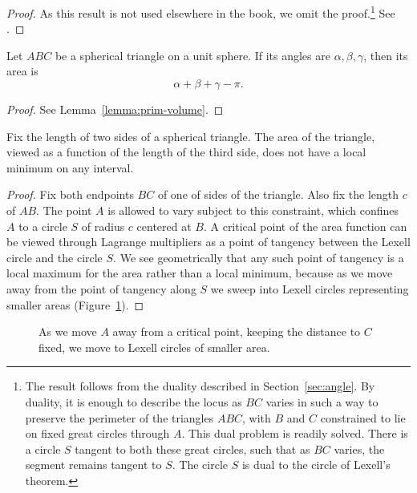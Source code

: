 \begin{proof} As this result is not used elsewhere in the book, we omit the proof.\footnote{The result follows from the duality described in Section~\ref{sec:angle}.  By duality, it is enough to describe the locus as $BC$ varies
in such a way to preserve the perimeter of the triangles $ABC$, with
$B$ and $C$ constrained to lie on fixed great circles through $A$.  This dual problem is
readily solved.
There is a circle $S$ tangent to both these great circles, such that
as $BC$ varies, 
the segment remains tangent to $S$.  The circle $S$ is dual
to the circle of Lexell's theorem.}
See \cite{Fej72}.
\end{proof}

\begin{lemma}[Girard] Let $ABC$ be a spherical triangle on a unit sphere. If its angles
are $\alpha,\beta,\gamma$, then its area is
   $$
   \alpha+\beta+\gamma-\pi.
   $$
\end{lemma}

\begin{proof} See Lemma~\ref{lemma:prim-volume}.
\end{proof}

\begin{lemma} Fix the length of two sides of a spherical triangle.
The area of the triangle, viewed as a function of the length of
the third side, does not have a local minimum on any interval.
\end{lemma}

\begin{proof}  Fix both endpoints $BC$ of one of sides of the triangle.
Also fix the length $c$ of $AB$.  The point $A$ is allowed to vary
subject to this constraint, which confines $A$ to a circle $S$
of radius $c$ centered at $B$.
A critical point of the area function can be viewed
through Lagrange multipliers 
as a point of tangency between the Lexell circle 
and the circle $S$.
We see geometrically that any such point of tangency is a local
maximum for the area rather than a local minimum, because as we
move away from the point of tangency along $S$ we sweep into
Lexell circles representing smaller areas (Figure~\ref{fig:13:A}).
\end{proof}

\begin{figure}[htb]
  \centering
  \caption{As we move $A$ away from a critical
point, keeping the distance to $C$ fixed, we move to Lexell
circles of smaller area.}
  \label{fig:13:A}
\end{figure}



